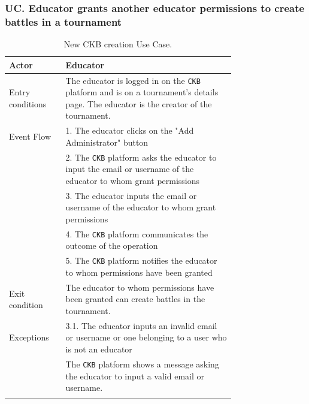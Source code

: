 \subsubsection*{UC\cuc . Educator grants another educator permissions to create battles in a tournament}
\begin{center}
    \begin{longtable}{lp{0.75\linewidth}}
        \hline
        Actor            & Educator \\
        \hline
        Entry conditions & The educator is logged in on the \verb|CKB| platform and is on a tournament's details page. The educator is the creator of the tournament.\\
        \hline
        Event Flow      
        & 1. The educator clicks on the "Add Administrator" button\\
        & 2. The \verb|CKB| platform asks the educator to input the email or username of the educator to whom grant permissions\\
        & 3. The educator inputs the email or username of the educator to whom grant permissions\\
        & 4. The \verb|CKB| platform communicates the outcome of the operation\\
        & 5. The \verb|CKB| platform notifies the educator to whom permissions have been granted\\
        \hline
        Exit condition   & The educator to whom permissions have been granted can create battles in the tournament.   \\
        \hline
        Exceptions   
        & 3.1. The educator inputs an invalid email or username or one belonging to a user who is not an educator\\
            & The \verb|CKB| platform shows a message asking the educator to input a valid email or username.  \\
        \hline
        \caption{New CKB creation Use Case.}
        \label{tab: grant_permissions_use_case}
    \end{longtable}

\end{center}


